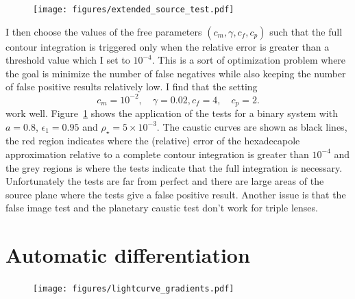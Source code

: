 \documentclass[12pt,dvipsnames]{report}
\begin{document}
\begin{figure}[t]
    \begin{centering}
        \texttt{[image: figures/extended\_source\_test.pdf]}
        \caption{}
            \label{fig:extended_source_test}
    \end{centering}
\end{figure}

I then choose the values of the free parameters $(c_m, \gamma, c_f, c_p)$ such that the 
full contour integration is triggered only when the relative error is greater than a threshold 
value which I set to $10^{-4}$. This is a sort of optimization problem where the goal is 
minimize the number of false negatives while also keeping the number of false positive results 
relatively low. I find that the setting 
\begin{equation}
    c_m=10^{-2},\quad \gamma=0.02, c_f=4, \quad c_p=2.
\end{equation}
work well. Figure~\ref{fig:extended_source_test} shows the application of the tests for a binary 
system with $a=0.8$, $\epsilon_1=0.95$ and $\rho_\star=5\times 10^{-3}$. The caustic 
curves are shown as black lines, the red region indicates where the (relative) error of 
the hexadecapole approximation relative to a complete contour integration is greater than 
$10^{-4}$ and the grey regions is where the tests indicate that the full integration is 
necessary. Unfortunately the tests are far from perfect and there are large areas of the 
source plane where the tests give a false positive result. 
Another issue is that the false image test and the planetary caustic test don't work 
for triple lenses. 

\section{Automatic differentiation}
\begin{figure}[t]
    \begin{centering}
        \texttt{[image: figures/lightcurve\_gradients.pdf]}
        \caption{}
            \label{fig:lightcurve_gradients}
    \end{centering}
\end{figure}
\end{document}
